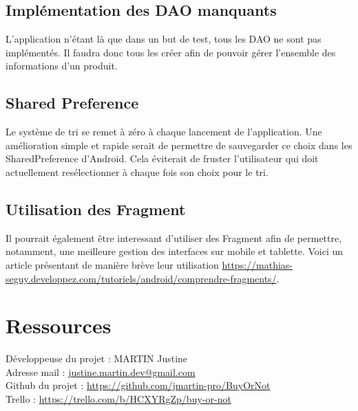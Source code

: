 \documentclass[report]{BetterDocument}
\begin{document}
		\section{Implémentation des DAO manquants}

			L'application n'étant là que dans un but de test, tous les DAO ne sont pas implémentés. Il faudra donc tous les créer afin de pouvoir gérer l'ensemble des informations d'un produit.

		\section{Shared Preference}

			Le système de tri se remet à zéro à chaque lancement de l'application. Une amélioration simple et rapide serait de permettre de sauvegarder ce choix dans les SharedPreference d'Android. Cela éviterait de fruster l'utilisateur qui doit actuellement resélectionner à chaque fois son choix pour le tri.

		\section{Utilisation des Fragment}

			Il pourrait également être interessant d'utiliser des Fragment afin de permettre, notamment, une meilleure gestion des interfaces sur mobile et tablette. Voici un article présentant de manière brève leur utilisation \url{https://mathias-seguy.developpez.com/tutoriels/android/comprendre-fragments/}.


	\chapter{Ressources}

		\noindent Développeuse du projet : MARTIN Justine\\
		Adresse mail : \href{mailto:justine.martin.dev@gmail.com}{justine.martin.dev@gmail.com}\\
		Github du projet : \url{https://github.com/jmartin-pro/BuyOrNot}\\
		Trello : \url{https://trello.com/b/HCXYRgZp/buy-or-not}
\end{document}

